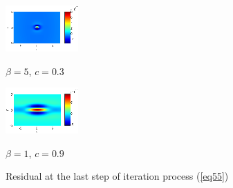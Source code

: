 \documentclass{article}
\newcommand{\rf}[1]{(\ref{#1})}
\begin{document}
\begin{figure}[htbp]
	\begin{minipage}[b]{0.5\linewidth}
		 \centering
		\includegraphics[width=\linewidth]{../EllipticEquationSJC/residual/residual_bt5c03.eps}
		\centerline{$\beta = 5$, $c = 0.3$}
	\end{minipage}	
	\begin{minipage}[b]{0.5\linewidth}
		\centering
		 \includegraphics[width=\linewidth]{../EllipticEquationSJC/residual/residual_bt1c09.eps}
	\centerline{$\beta = 1$, $c = 0.9$ }
	\end{minipage}
		\caption{Residual at the last step of iteration process \rf{eq55} }
		\label{resid}
\end{figure}
\end{document}
